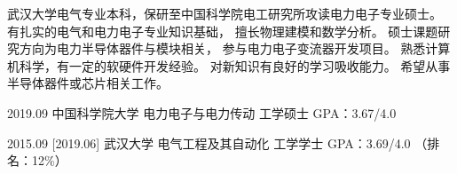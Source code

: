 \documentclass[zh]{resume}
\begin{document}
\makeheader

{\onehalfspacing\hspace{2em}%
武汉大学电气专业本科，保研至中国科学院电工研究所攻读电力电子专业硕士。
有扎实的电气和电力电子专业知识基础，
擅长物理建模和数学分析。
硕士课题研究方向为电力半导体器件与模块相关，
参与电力电子变流器开发项目。
熟悉计算机科学，有一定的软硬件开发经验。
对新知识有良好的学习吸收能力。
希望从事半导体器件或芯片相关工作。
\par}

\begin{educations}
  \education%
    {2019.09}%
    {中国科学院大学}%
    {电力电子与电力传动}%
    {工学硕士}%
    {GPA：3.67/4.0}
    

  \separator{0.1ex}
  \education%
    {2015.09}%
    [2019.06]%
    {武汉大学}%
    {电气工程及其自动化}%
    {工学学士}%
    {GPA：3.69/4.0 （排名：12\%）}
\end{educations}

\begin{competences}

    
\end{competences}
\end{document}
